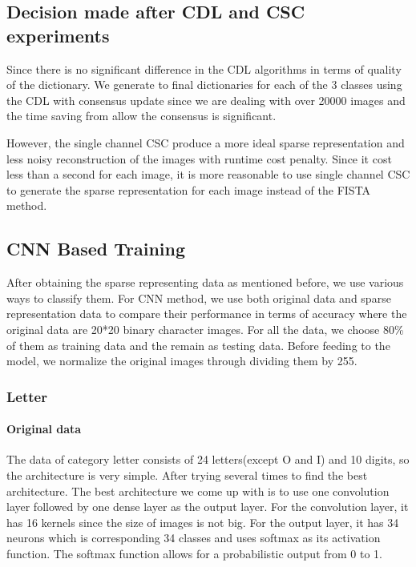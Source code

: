 \subsection{Decision made after CDL and CSC experiments}
Since there is no significant difference in the CDL algorithms in terms of 
quality of the dictionary. We generate to final dictionaries for each of the
3 classes using the CDL with consensus update since we are dealing with 
over 20000 images and the time saving from allow the consensus is significant.

However, the single channel CSC produce a more ideal sparse representation
and less noisy reconstruction of the images with runtime cost penalty. Since 
it cost less than a second for each image, it is more reasonable to use single
channel CSC to generate the sparse representation for each image instead of the 
FISTA method.

\subsection{CNN Based Training}
After obtaining the sparse representing data as mentioned before, 
we use various ways to classify them. For CNN method, we use both original data 
and sparse representation data to compare their performance in terms of accuracy where
the original data are 20*20 binary character images.
For all the data, we choose 80\% of them as training data and the remain as testing data.
Before feeding to the model, we normalize the original images through dividing them by 255.

\subsubsection{Letter}
\paragraph{Original data} 
The data of category letter consists of 24 letters(except O and I) and 10 digits, 
so the architecture is very simple. After trying several times to find the best architecture.
The best architecture we come up with is to use one convolution layer followed by one dense 
layer as the output layer. 
For the convolution layer, it has 16 kernels since the size of images is not big. 
For the output layer, it has 34 neurons which is corresponding 34 classes and uses softmax as its 
activation function. The softmax function allows for a probabilistic output from 0 to 1. 

